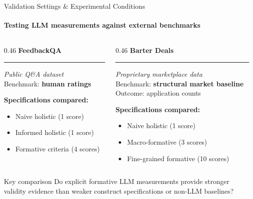 



\begin{frame}{Validation Settings \& Experimental Conditions}
\framesubtitle{Testing LLM measurements against external benchmarks}

\begin{columns}[t]
    \begin{column}{0.46\textwidth}
        {\large \textbf{FeedbackQA}}\\[0.1cm]
        \hrule
        \vspace{0.2cm}
        \textit{Public Q\&A dataset}\\[0.1cm]
        Benchmark: \textbf{human ratings}

        \vspace{0.70cm}
        \textbf{Specifications compared:}
        \begin{itemize}
            \item Naive holistic (1 score)
            \item Informed holistic (1 score)
            \item Formative criteria (4 scores)
        \end{itemize}
    \end{column}

    \begin{column}{0.46\textwidth}
        {\large \textbf{Barter Deals}}\\[0.1cm]
        \hrule
        \vspace{0.2cm}
        \textit{Proprietary marketplace data}\\[0.1cm]
        Benchmark: \textbf{structural market baseline}\\
        Outcome: application counts

        \vspace{0.25cm}
        \textbf{Specifications compared:}
        \begin{itemize}
            \item Naive holistic (1 score)
            \item Macro-formative (3 scores)
            \item Fine-grained formative (10 scores)
        \end{itemize}
    \end{column}
\end{columns}

\vfill

\begin{block}{Key comparison}
Do explicit formative LLM measurements provide stronger validity evidence than weaker construct specifications or non-LLM baselines?
\end{block}

\end{frame}
